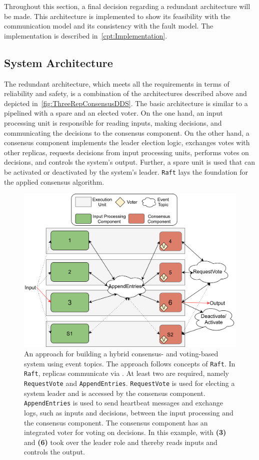 \noindent
Throughout this section, a final decision regarding a redundant architecture will be made.
This architecture is implemented to show its feasibility with the  communication model and its consistency with the fault model.
The implementation is described in~\autoref{cpt:Implementation}.

\subsection{System Architecture}
\label{subsec:SystemArchitecture}

The redundant architecture, which meets all the requirements in terms of reliability and safety, is a combination of the architectures described above and depicted in~\autoref{fig:ThreeRepConsensusDDS}.
The basic architecture is similar to a pipelined  with a spare and an elected voter.
On the one hand, an input processing unit is responsible for reading inputs, making decisions, and communicating the decisions to the consensus component.
On the other hand, a consensus component implements the leader election logic, exchanges votes with other replicas, requests decisions from input processing units, performs votes on decisions, and controls the system's output.
Further, a spare unit is used that can be activated or deactivated by the system's leader.
\texttt{Raft} lays the foundation for the applied consensus algorithm.

\begin{figure}[!ht]
	\centering
	\includegraphics[width=0.9\linewidth]{images/ThreeEUConsensusDDS}
	\caption{An approach for building a hybrid consensus- and voting-based  system using  event topics. The approach follows concepts of \texttt{Raft}. In \texttt{Raft}, replicas communicate via . At least two  are required, namely \texttt{RequestVote} and \texttt{AppendEntries}. \texttt{RequestVote} is used for electing a system leader and is accessed by the consensus component. \texttt{AppendEntries} is used to send heartbeat messages and exchange logs, such as inputs and decisions, between the input processing and the consensus component. The consensus component has an integrated voter for voting on decisions. In this example,  with \textbf{(3)} and \textbf{(6)} took over the leader role and thereby reads inputs and controls the output.}
	\label{fig:ThreeRepConsensusDDS}
\end{figure}


